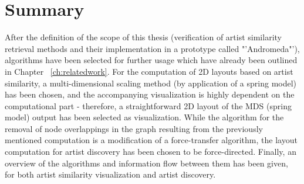 \section{Summary}

After the definition of the scope of this thesis (verification of artist similarity retrieval methods and their implementation in a prototype called "'Andromeda"'), algorithms have been selected for further usage which have already been outlined in Chapter ~\ref{ch:relatedwork}. For the computation of 2D layouts based on artist similarity, a multi-dimensional scaling method (by application of a spring model) has been chosen, and the accompanying visualization is highly dependent on the computational part - therefore, a straightforward 2D layout of the MDS (spring model) output has been selected as visualization. 
While the algorithm for the removal of node overlappings in the graph resulting from the previously mentioned computation is a modification of a force-transfer algorithm, the layout computation for artist discovery has been chosen to be force-directed. Finally, an overview of the algorithms and information flow between them has been given, for both artist similarity visualization and artist discovery.